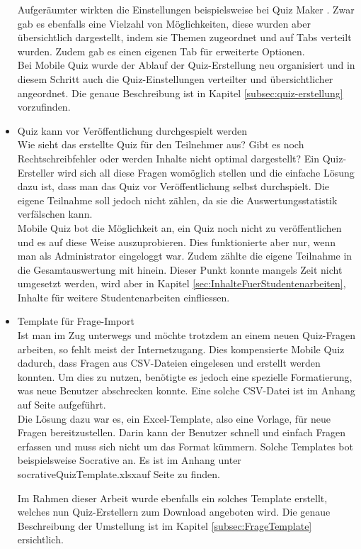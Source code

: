 \begin{itemize}
		Aufgeräumter wirkten die Einstellungen beispielsweise bei Quiz Maker \cite{quiz-maker}. Zwar gab es ebenfalls eine Vielzahl von Möglichkeiten, diese wurden aber übersichtlich dargestellt, indem sie Themen zugeordnet und auf Tabs verteilt wurden. Zudem gab es einen eigenen Tab für erweiterte Optionen. \\
		Bei Mobile Quiz wurde der Ablauf der Quiz-Erstellung neu organisiert und in diesem Schritt auch die Quiz-Einstellungen verteilter und übersichtlicher angeordnet. Die genaue Beschreibung ist in Kapitel \ref{subsec:quiz-erstellung} vorzufinden.
		
		
		
		\item Quiz kann vor Veröffentlichung durchgespielt werden \\
		Wie sieht das erstellte Quiz für den Teilnehmer aus? Gibt es noch Rechtschreibfehler oder werden Inhalte nicht optimal dargestellt? Ein Quiz-Ersteller wird sich all diese Fragen womöglich stellen und die einfache Lösung dazu ist, dass man das Quiz vor Veröffentlichung selbst durchspielt. Die eigene Teilnahme soll jedoch nicht zählen, da sie die Auswertungsstatistik verfälschen kann. \\
		Mobile Quiz bot die Möglichkeit an, ein Quiz noch nicht zu veröffentlichen und es auf diese Weise auszuprobieren. Dies funktionierte aber nur, wenn man als Administrator eingeloggt war. Zudem zählte die eigene Teilnahme in die Gesamtauswertung mit hinein.
		Dieser Punkt konnte mangels Zeit nicht umgesetzt werden, wird aber in Kapitel \ref{sec:InhalteFuerStudentenarbeiten}, Inhalte für weitere Studentenarbeiten einfliessen.
		
		
		\item Template für Frage-Import \\
		Ist man im Zug unterwegs und möchte trotzdem an einem neuen Quiz-Fragen arbeiten, so fehlt meist der Internetzugang. Dies kompensierte Mobile Quiz dadurch, dass Fragen aus \gls{CSV}-Dateien eingelesen und erstellt werden konnten. Um dies zu nutzen, benötigte es jedoch eine spezielle Formatierung, was neue Benutzer abschrecken konnte. Eine solche CSV-Datei ist im Anhang auf Seite \hyperlink{page.\getpagerefnumber{pdf:csvTemplate}}{} aufgeführt. \\
		Die Lösung dazu war es, ein Excel-Template, also eine Vorlage, für neue Fragen bereitzustellen. Darin kann der Benutzer schnell und einfach Fragen erfassen und muss sich nicht um das Format kümmern. Solche Templates bot beispielsweise
		Socrative \cite{socrative.com} an. Es ist im Anhang unter \glqq socrativeQuizTemplate.xlsx\grqq auf Seite \hyperlink{page.\getpagerefnumber{pdf:socrative}}{} zu finden.
		
		Im Rahmen dieser Arbeit wurde ebenfalls ein solches Template erstellt, welches nun Quiz-Erstellern zum Download angeboten wird. Die genaue Beschreibung der Umstellung ist im Kapitel \ref{subsec:FrageTemplate} ersichtlich.
		
	\end{itemize}